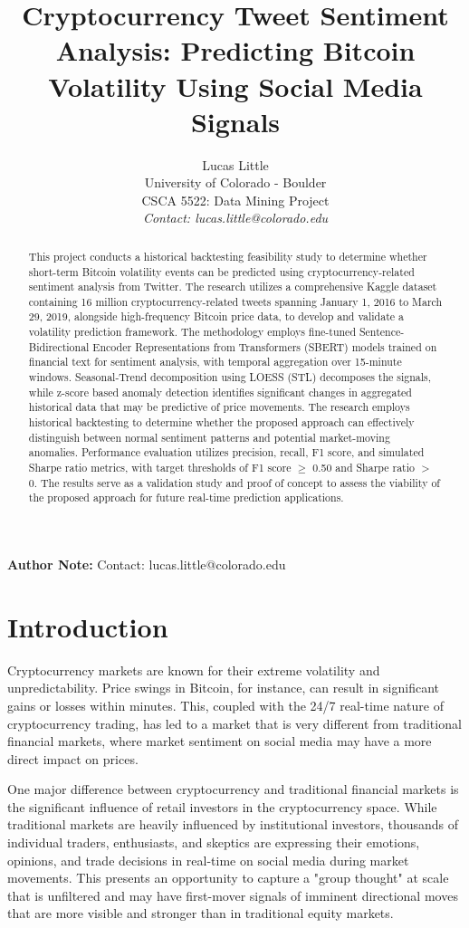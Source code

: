 \documentclass[11pt,twocolumn]{article}
\title{Cryptocurrency Tweet Sentiment Analysis: Predicting Bitcoin Volatility Using Social Media Signals}
\author{Lucas Little\\
University of Colorado - Boulder\\
CSCA 5522: Data Mining Project\\
\textit{Contact: lucas.little@colorado.edu}}
\begin{document}
\maketitle

\noindent\textbf{Author Note:} Contact: lucas.little@colorado.edu

\begin{abstract}
    This project conducts a historical backtesting feasibility study to determine whether short-term Bitcoin volatility events can be predicted using cryptocurrency-related sentiment analysis from Twitter. The research utilizes a comprehensive Kaggle dataset containing 16 million cryptocurrency-related tweets spanning January 1, 2016 to March 29, 2019, alongside high-frequency Bitcoin price data, to develop and validate a volatility prediction framework. The methodology employs fine-tuned Sentence-Bidirectional Encoder Representations from Transformers (SBERT) models trained on financial text for sentiment analysis, with temporal aggregation over 15-minute windows. Seasonal-Trend decomposition using LOESS (STL) decomposes the signals, while z-score based anomaly detection identifies significant changes in aggregated historical data that may be predictive of price movements. The research employs historical backtesting to determine whether the proposed approach can effectively distinguish between normal sentiment patterns and potential market-moving anomalies. Performance evaluation utilizes precision, recall, F1 score, and simulated Sharpe ratio metrics, with target thresholds of F1 score $\geq$ 0.50 and Sharpe ratio $>$ 0. The results serve as a validation study and proof of concept to assess the viability of the proposed approach for future real-time prediction applications.
\end{abstract}

\section{Introduction}
Cryptocurrency markets are known for their extreme volatility and unpredictability. Price swings in Bitcoin, for instance, can result in significant gains or losses within minutes. This, coupled with the 24/7 real-time nature of cryptocurrency trading, has led to a market that is very different from traditional financial markets, where market sentiment on social media may have a more direct impact on prices.

One major difference between cryptocurrency and traditional financial markets is the significant influence of retail investors in the cryptocurrency space. While traditional markets are heavily influenced by institutional investors, thousands of individual traders, enthusiasts, and skeptics are expressing their emotions, opinions, and trade decisions in real-time on social media during market movements. This presents an opportunity to capture a "group thought" at scale that is unfiltered and may have first-mover signals of imminent directional moves that are more visible and stronger than in traditional equity markets.
\end{document}
